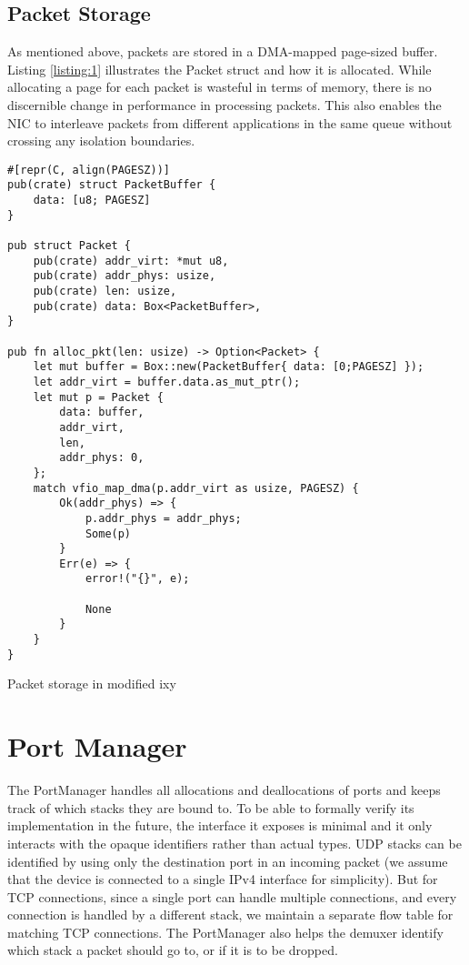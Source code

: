 \subsection{Packet Storage}
As mentioned above, packets are stored in a DMA-mapped page-sized buffer. Listing \ref{listing:1} illustrates the Packet struct and how it is allocated. While allocating a page for each packet is wasteful in terms of memory, there is no discernible change in performance in processing packets. This also enables the NIC to interleave packets from different applications in the same queue without crossing any isolation boundaries.

\begin{listing}[!ht]
\begin{verbatim}
#[repr(C, align(PAGESZ))]
pub(crate) struct PacketBuffer {
    data: [u8; PAGESZ]
}

pub struct Packet {
    pub(crate) addr_virt: *mut u8,
    pub(crate) addr_phys: usize,
    pub(crate) len: usize,
    pub(crate) data: Box<PacketBuffer>,
}

pub fn alloc_pkt(len: usize) -> Option<Packet> {
    let mut buffer = Box::new(PacketBuffer{ data: [0;PAGESZ] });
    let addr_virt = buffer.data.as_mut_ptr();
    let mut p = Packet {
        data: buffer,
        addr_virt,
        len,
        addr_phys: 0,
    };
    match vfio_map_dma(p.addr_virt as usize, PAGESZ) {
        Ok(addr_phys) => {
            p.addr_phys = addr_phys;
            Some(p)
        }
        Err(e) => {
            error!("{}", e);

            None
        }
    }
}
\end{verbatim}
\caption{Packet storage in modified ixy}
\label{listing:1}
\end{listing}


\section{Port Manager}
The PortManager handles all allocations and deallocations of ports and keeps track of which stacks they are bound to. To be able to formally verify its implementation in the future, the interface it exposes is minimal and it only interacts with the opaque identifiers rather than actual types. 
UDP stacks can be identified by using only the destination port in an incoming packet (we assume that the device is connected to a single IPv4 interface for simplicity). But for TCP connections, since a single port can handle multiple connections, and every connection is handled by a different stack, we maintain a separate flow table for matching TCP connections.
The PortManager also helps the demuxer identify which stack a packet should go to, or if it is to be dropped.


